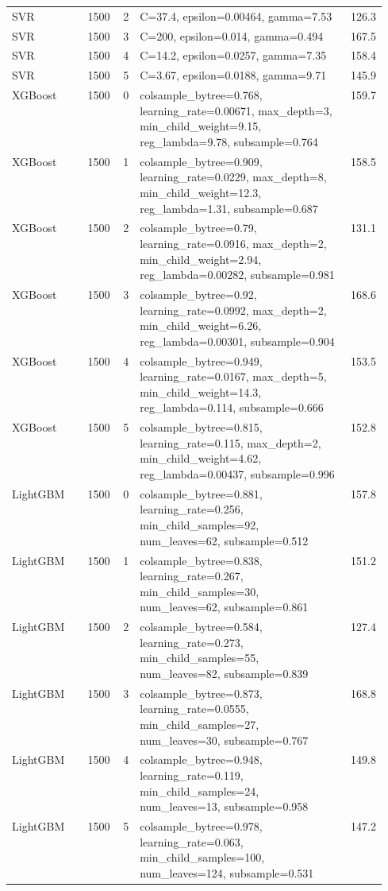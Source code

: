 \begin{longtable}{lrrp{0.55\linewidth}r}
SVR & 1500 & 2 & C=37.4, epsilon=0.00464, gamma=7.53 & 126.3 \\
SVR & 1500 & 3 & C=200, epsilon=0.014, gamma=0.494 & 167.5 \\
SVR & 1500 & 4 & C=14.2, epsilon=0.0257, gamma=7.35 & 158.4 \\
SVR & 1500 & 5 & C=3.67, epsilon=0.0188, gamma=9.71 & 145.9 \\
XGBoost & 1500 & 0 & colsample\_bytree=0.768, learning\_rate=0.00671, max\_depth=3, min\_child\_weight=9.15, reg\_lambda=9.78, subsample=0.764 & 159.7 \\
XGBoost & 1500 & 1 & colsample\_bytree=0.909, learning\_rate=0.0229, max\_depth=8, min\_child\_weight=12.3, reg\_lambda=1.31, subsample=0.687 & 158.5 \\
XGBoost & 1500 & 2 & colsample\_bytree=0.79, learning\_rate=0.0916, max\_depth=2, min\_child\_weight=2.94, reg\_lambda=0.00282, subsample=0.981 & 131.1 \\
XGBoost & 1500 & 3 & colsample\_bytree=0.92, learning\_rate=0.0992, max\_depth=2, min\_child\_weight=6.26, reg\_lambda=0.00301, subsample=0.904 & 168.6 \\
XGBoost & 1500 & 4 & colsample\_bytree=0.949, learning\_rate=0.0167, max\_depth=5, min\_child\_weight=14.3, reg\_lambda=0.114, subsample=0.666 & 153.5 \\
XGBoost & 1500 & 5 & colsample\_bytree=0.815, learning\_rate=0.115, max\_depth=2, min\_child\_weight=4.62, reg\_lambda=0.00437, subsample=0.996 & 152.8 \\
LightGBM & 1500 & 0 & colsample\_bytree=0.881, learning\_rate=0.256, min\_child\_samples=92, num\_leaves=62, subsample=0.512 & 157.8 \\
LightGBM & 1500 & 1 & colsample\_bytree=0.838, learning\_rate=0.267, min\_child\_samples=30, num\_leaves=62, subsample=0.861 & 151.2 \\
LightGBM & 1500 & 2 & colsample\_bytree=0.584, learning\_rate=0.273, min\_child\_samples=55, num\_leaves=82, subsample=0.839 & 127.4 \\
LightGBM & 1500 & 3 & colsample\_bytree=0.873, learning\_rate=0.0555, min\_child\_samples=27, num\_leaves=30, subsample=0.767 & 168.8 \\
LightGBM & 1500 & 4 & colsample\_bytree=0.948, learning\_rate=0.119, min\_child\_samples=24, num\_leaves=13, subsample=0.958 & 149.8 \\
LightGBM & 1500 & 5 & colsample\_bytree=0.978, learning\_rate=0.063, min\_child\_samples=100, num\_leaves=124, subsample=0.531 & 147.2 \\

\end{longtable}
